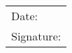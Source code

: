 \documentclass[12pt, a4paper, bibtotoc]{scrartcl}
\theoremstyle{break}
\begin{document}
\vspace{2cm} %

\begin{flushright}
\begin{tabular}{p{8cm}}
Date: \underline{\hspace{3cm}} \\ [1.0ex]
Signature: \underline{\hspace{3cm}}
\end{tabular}
\end{flushright}

\vfill\null
\newpage
\end{document}
